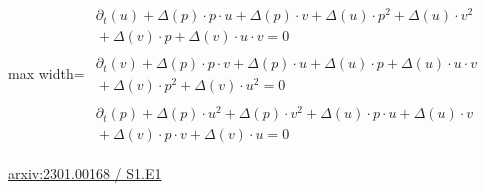 \documentclass[10pt,a4paper]{article}
\begin{document}
\begin{minipage}{\linewidth}
\begin{center}\begin{adjustbox}{max width=\linewidth}$\displaystyle\begin{gathered}\begin{gathered}\partial_{t}(u)+\Delta(p)\cdot p\cdot u+\Delta(p)\cdot v+\Delta(u)\cdot p^{2}+\Delta(u)\cdot v^{2}\\[-1pt]{}+\Delta(v)\cdot p+\Delta(v)\cdot u\cdot v=0\end{gathered}\\[5pt]\begin{gathered}\partial_{t}(v)+\Delta(p)\cdot p\cdot v+\Delta(p)\cdot u+\Delta(u)\cdot p+\Delta(u)\cdot u\cdot v\\[-1pt]{}+\Delta(v)\cdot p^{2}+\Delta(v)\cdot u^{2}=0\end{gathered}\\[5pt]\begin{gathered}\partial_{t}(p)+\Delta(p)\cdot u^{2}+\Delta(p)\cdot v^{2}+\Delta(u)\cdot p\cdot u+\Delta(u)\cdot v\\[-1pt]{}+\Delta(v)\cdot p\cdot v+\Delta(v)\cdot u=0\end{gathered}\end{gathered}$\end{adjustbox}\end{center}
{\small \href{https://arxiv.org/html/2301.00168#S1.E1}{arxiv:2301.00168 / S1.E1}}\par
\end{minipage}\par\vspace{7mm}
\end{document}
